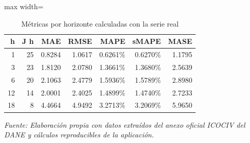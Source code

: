 \begin{table}[H]
\centering
\caption{Métricas por horizonte calculadas con la serie real}
\label{tab:ejemplo_metricas_vias_urbanas}
\scriptsize
\begin{adjustbox}{max width=\linewidth}
\begin{tabular}{rrrrrrr}
\toprule
h & J h & MAE & RMSE & MAPE & sMAPE & MASE \\
\midrule
1 & 25 & 0.8284 & 1.0617 & 0.6261\% & 0.6270\% & 1.1795 \\
3 & 23 & 1.8120 & 2.0780 & 1.3661\% & 1.3680\% & 2.5639 \\
6 & 20 & 2.1063 & 2.4779 & 1.5936\% & 1.5789\% & 2.8980 \\
12 & 14 & 2.0001 & 2.4025 & 1.4899\% & 1.4740\% & 2.7233 \\
18 & 8 & 4.4664 & 4.9492 & 3.2713\% & 3.2069\% & 5.9650 \\
\bottomrule
\end{tabular}
\end{adjustbox}
\par\footnotesize\textit{Fuente: Elaboración propia con datos extraídos del anexo oficial ICOCIV del DANE y cálculos reproducibles de la aplicación.}
\end{table}
